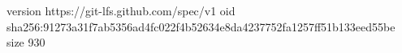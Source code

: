 version https://git-lfs.github.com/spec/v1
oid sha256:91273a31f7ab5356ad4fc022f4b52634e8da4237752fa1257ff51b133eed55be
size 930
